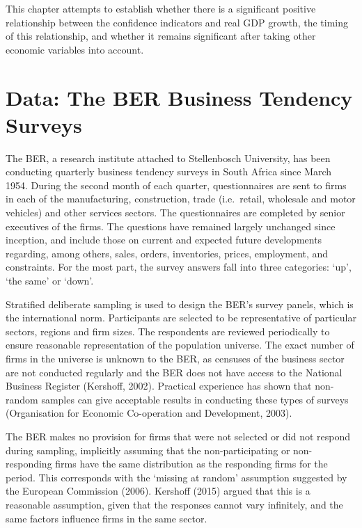 \documentclass[11pt,]{article}
\begin{document}
This chapter attempts to establish whether there is a significant
positive relationship between the confidence indicators and real GDP
growth, the timing of this relationship, and whether it remains
significant after taking other economic variables into account.

\section{Data: The BER Business Tendency
Surveys}\label{data-the-ber-business-tendency-surveys}

The BER, a research institute attached to Stellenbosch University, has
been conducting quarterly business tendency surveys in South Africa
since March 1954. During the second month of each quarter,
questionnaires are sent to firms in each of the manufacturing,
construction, trade (i.e.~retail, wholesale and motor vehicles) and
other services sectors. The questionnaires are completed by senior
executives of the firms. The questions have remained largely unchanged
since inception, and include those on current and expected future
developments regarding, among others, sales, orders, inventories,
prices, employment, and constraints. For the most part, the survey
answers fall into three categories: `up', `the same' or `down'.

Stratified deliberate sampling is used to design the BER's survey
panels, which is the international norm. Participants are selected to be
representative of particular sectors, regions and firm sizes. The
respondents are reviewed periodically to ensure reasonable
representation of the population universe. The exact number of firms in
the universe is unknown to the BER, as censuses of the business sector
are not conducted regularly and the BER does not have access to the
National Business Register (Kershoff, 2002). Practical experience has
shown that non-random samples can give acceptable results in conducting
these types of surveys (Organisation for Economic Co-operation and
Development, 2003).

The BER makes no provision for firms that were not selected or did not
respond during sampling, implicitly assuming that the non-participating
or non-responding firms have the same distribution as the responding
firms for the period. This corresponds with the `missing at random'
assumption suggested by the European Commission (2006). Kershoff (2015)
argued that this is a reasonable assumption, given that the responses
cannot vary infinitely, and the same factors influence firms in the same
sector.
\end{document}
